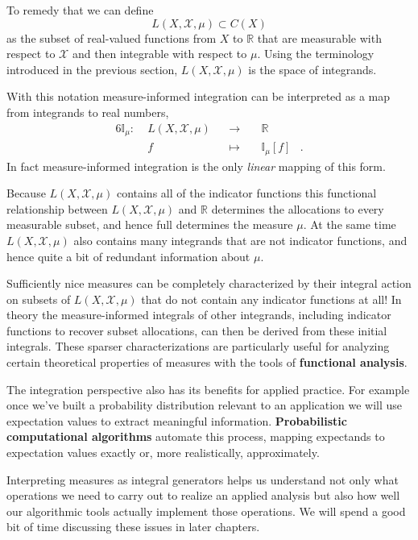 \documentclass[
  letterpaper,
  DIV=11,
  numbers=noendperiod]{scrartcl}
\begin{document}
To remedy that we can define \[
L(X, \mathcal{X}, \mu) \subset C(X)
\] as the subset of real-valued functions from \(X\) to \(\mathbb{R}\)
that are measurable with respect to \(\mathcal{X}\) and then integrable
with respect to \(\mu\). Using the terminology introduced in the
previous section, \(L(X, \mathcal{X}, \mu)\) is the space of integrands.

With this notation measure-informed integration can be interpreted as a
map from integrands to real numbers, \begin{alignat*}{6}
\mathbb{I}_{\mu} :\; & L(X, \mathcal{X}, \mu) & &\rightarrow& \;
& \mathbb{R} &
\\
& f & &\mapsto& & \mathbb{I}_{\mu}[f] &.
\end{alignat*} In fact measure-informed integration is the only
\emph{linear} mapping of this form.

Because \(L(X, \mathcal{X}, \mu)\) contains all of the indicator
functions this functional relationship between
\(L(X, \mathcal{X}, \mu)\) and \(\mathbb{R}\) determines the allocations
to every measurable subset, and hence full determines the measure
\(\mu\). At the same time \(L(X, \mathcal{X}, \mu)\) also contains many
integrands that are not indicator functions, and hence quite a bit of
redundant information about \(\mu\).

Sufficiently nice measures can be completely characterized by their
integral action on subsets of \(L(X, \mathcal{X}, \mu)\) that do not
contain any indicator functions at all! In theory the measure-informed
integrals of other integrands, including indicator functions to recover
subset allocations, can then be derived from these initial integrals.
These sparser characterizations are particularly useful for analyzing
certain theoretical properties of measures with the tools of
\textbf{functional analysis}.

The integration perspective also has its benefits for applied practice.
For example once we've built a probability distribution relevant to an
application we will use expectation values to extract meaningful
information. \textbf{Probabilistic computational algorithms} automate
this process, mapping expectands to expectation values exactly or, more
realistically, approximately.

Interpreting measures as integral generators helps us understand not
only what operations we need to carry out to realize an applied analysis
but also how well our algorithmic tools actually implement those
operations. We will spend a good bit of time discussing these issues in
later chapters.
\end{document}
